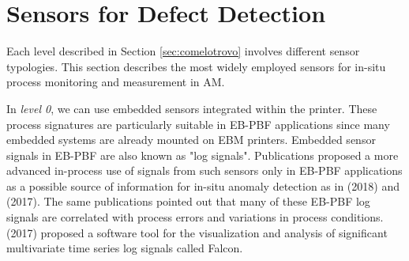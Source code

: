 
\section{Sensors for Defect Detection}
\label{sec:sensoriniiniini}
Each level described in Section \ref{sec:comelotrovo} involves different sensor typologies. This section describes the most widely employed sensors for in-situ process monitoring and measurement in AM. 

In \emph{level 0}, we can use embedded sensors integrated within the printer. These process signatures are particularly suitable in EB-PBF applications since many embedded systems are already mounted on EBM printers. Embedded sensor signals in EB-PBF are also known as "log signals". Publications proposed a more advanced in-process use of signals from such sensors only in EB-PBF applications as a possible source of information for in-situ anomaly detection as in \citeauthor{grasso_data_2018} (2018) and \citeauthor{steed_falcon_2017} (2017). The same publications pointed out that many of these EB-PBF log signals are correlated with process errors and variations in process conditions. \citeauthor{steed_falcon_2017} (2017) proposed a software tool for the visualization and analysis of significant multivariate time series log signals called Falcon. 

